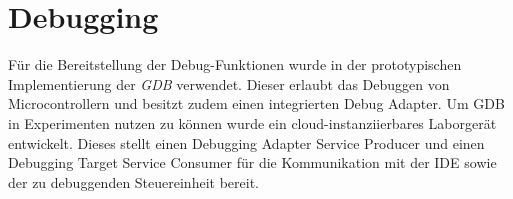 \section{Debugging}\label{section:prototypische-implementierung:debugging}


Für die Bereitstellung der Debug-Funktionen wurde in der prototypischen Implementierung der \textit{\ac{GDB}} \cite{noauthor_gdb_nodate} verwendet. Dieser erlaubt das Debuggen von Microcontrollern und besitzt zudem einen integrierten Debug Adapter. Um \ac{GDB} in Experimenten nutzen zu können wurde ein cloud-instanziierbares Laborgerät entwickelt. Dieses stellt einen Debugging Adapter Service Producer und einen Debugging Target Service Consumer für die Kommunikation mit der IDE sowie der zu debuggenden Steuereinheit bereit.

